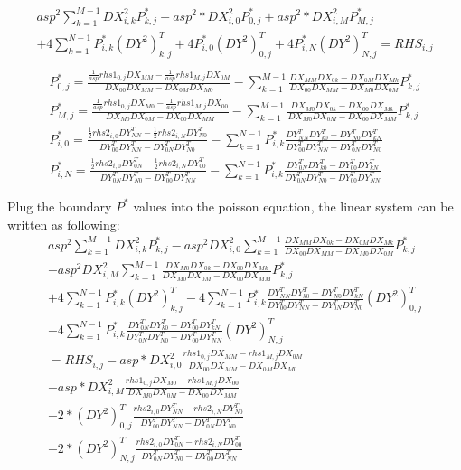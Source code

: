 \documentclass[12pt]{article}
\begin{document}
\begin{description}
\begin{align}
  asp^{2}\sum_{k=1}^{M-1}DX^{2}_{i,k}P^{*}_{k,j}
+ asp^{2}*DX^{2}_{i,0}P^{*}_{0,j}+asp^{2}*DX^{2}_{i,M}P^{*}_{M,j}\\
+ 4\sum_{k=1}^{N-1}P^{*}_{i,k}(DY^{2})^{T}_{k,j}
+ 4P^{*}_{i,0}(DY^{2})^{T}_{0,j}
+ 4P^{*}_{i,N}(DY^{2})^{T}_{N,j}
= RHS_{i,j}\\
\end{align}
\begin{align}
P^{*}_{0,j} =
\frac{\frac{1}{asp}rhs1_{0,j}DX_{MM}-\frac{1}{asp} rhs1_{M,j}DX_{0M}}{DX_{00}DX_{MM}-DX_{0M}DX_{M0}}
-\sum_{k=1}^{M-1}\frac{DX_{MM}DX_{0k}-DX_{0M}DX_{Mk}}
{DX_{00}DX_{MM}-DX_{M0}DX_{0M}} P^{*}_{k,j}\\
P^{*}_{M,j} =
\frac{\frac{1}{asp} rhs1_{0,j}DX_{M0}-\frac{1}{asp}rhs1_{M,j}DX_{00}}{DX_{M0}DX_{0M}-DX_{00}DX_{MM}}
-\sum_{k=1}^{M-1}\frac{DX_{M0}DX_{0k}-DX_{00}DX_{Mk}}
{DX_{M0}DX_{0M}-DX_{00}DX_{MM}} P^{*}_{k,j}\\
P^{*}_{i,0} =
\frac{\frac{1}{2}rhs2_{i,0}DY^{T}_{NN}-\frac{1}{2} rhs2_{i,N}DY^{T}_{N0}}{DY^{T}_{00}DY^{T}_{NN}-DY^{T}_{0N}DY^{T}_{N0}}
-\sum_{k=1}^{N-1}P^{*}_{i,k}\frac{DY^{T}_{NN}DY^{T}_{k0}-DY^{T}_{N0}DY^{T}_{kN}}
{DY^{T}_{00}DY^{T}_{NN}-DY^{T}_{0N}DY^{T}_{N0}} \\
P^{*}_{i,N} =
\frac{\frac{1}{2}rhs2_{i,0}DY^{T}_{0N}-\frac{1}{2} rhs2_{i,N}DY^{T}_{00}}{DY^{T}_{0N}DY^{T}_{N0}-DY^{T}_{00}DY^{T}_{NN}}
-\sum_{k=1}^{N-1}P^{*}_{i,k}\frac{DY^{T}_{0N}DY^{T}_{k0}-DY^{T}_{00}DY^{T}_{kN}}
{DY^{T}_{0N}DY^{T}_{N0}-DY^{T}_{00}DY^{T}_{NN}}
\end{align}

Plug the boundary $P^{*}$  values into the poisson equation, the linear system can be written as following:\\
\begin{align}
asp^{2}\sum_{k=1}^{M-1}DX^{2}_{i,k}P^{*}_{k,j}
-asp^{2}DX^{2}_{i,0} \sum_{k=1}^{M-1}\frac{DX_{MM}DX_{0k}-DX_{0M}DX_{Mk}}
{DX_{00}DX_{MM}-DX_{M0}DX_{0M}} P^{*}_{k,j}\\
-asp^{2}DX^{2}_{i,M}\sum_{k=1}^{M-1}\frac{DX_{M0}DX_{0k}-DX_{00}DX_{Mk}}
{DX_{M0}DX_{0M}-DX_{00}DX_{MM}} P^{*}_{k,j}\\
+4\sum_{k=1}^{N-1}P^{*}_{i,k}(DY^{2})^{T}_{k,j}
-4\sum_{k=1}^{N-1}P^{*}_{i,k}\frac{DY^{T}_{NN}DY^{T}_{k0}-DY^{T}_{N0}DY^{T}_{kN}}
{DY^{T}_{00}DY^{T}_{NN}-DY^{T}_{0N}DY^{T}_{N0}}(DY^{2})^{T}_{0,j}\\
-4\sum_{k=1}^{N-1}P^{*}_{i,k}\frac{DY^{T}_{0N}DY^{T}_{k0}-DY^{T}_{00}DY^{T}_{kN}}
{DY^{T}_{0N}DY^{T}_{N0}-DY^{T}_{00}DY^{T}_{NN}}(DY^{2})^{T}_{N,j}\\
= RHS_{i,j}-asp*DX^{2}_{i,0}\frac{rhs1_{0,j}DX_{MM} - rhs1_{M,j}DX_{0M}}{DX_{00}DX_{MM}-DX_{0M}DX_{M0}}\\
-asp*DX^{2}_{i,M}\frac{rhs1_{0,j}DX_{M0}-rhs1_{M,j}DX_{00}}{DX_{M0}DX_{0M}-DX_{00}DX_{MM}}\\
-2*(DY^{2})^{T}_{0,j}\frac{rhs2_{i,0}DY^{T}_{NN}- rhs2_{i,N}DY^{T}_{N0}}{DY^{T}_{00}DY^{T}_{NN}-DY^{T}_{0N}DY^{T}_{N0}}\\
-2*(DY^{2})^{T}_{N,j}\frac{rhs2_{i,0}DY^{T}_{0N}- rhs2_{i,N}DY^{T}_{00}}{DY^{T}_{0N}DY^{T}_{N0}-DY^{T}_{00}DY^{T}_{NN}}
\end{align}



\end{description}
\end{document}
